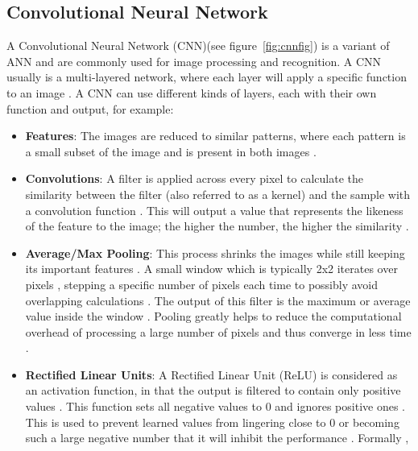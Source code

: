 \subsection{Convolutional Neural Network}\label{sec:headings}
A Convolutional Neural Network (CNN)(see figure~\ref{fig:cnnfig}) is a variant of ANN and are commonly used for image processing and recognition. A CNN usually is a multi-layered network, where each layer will apply a specific function to an image \cite{NIPS2012_4824, karpathy_2018}. A CNN can use different kinds of layers, each with their own function and output, for example:
\begin{itemize}
	\item\textbf{Features}: The images are reduced to similar patterns, where each pattern is a small subset of the image and is present in both images \cite{rohrer_2016}.
	\item\textbf{Convolutions}: A filter is applied across every pixel to calculate the similarity between the filter (also referred to as a kernel) and the sample with a convolution function \cite{rohrer_2016}. This will output a value that represents the likeness of the feature to the image; the higher the number, the higher the similarity \cite{rohrer_2016}.
	\item\textbf{Average/Max Pooling}: This process shrinks the images while still keeping its important features \cite{rohrer_2016}. A small window which is typically 2x2 iterates over pixels \cite{karpathy_2018}, stepping a specific number of pixels each time to possibly avoid overlapping calculations \cite{Ciresan:2011:FHP:2283516.2283603}. The output of this filter is the maximum or average value inside the window \cite{rohrer_2016}. Pooling greatly helps to reduce the computational overhead of processing a large number of pixels and thus converge in less time \cite{Ciresan:2011:FHP:2283516.2283603}.
	\item\textbf{Rectified Linear Units}: A Rectified Linear Unit (ReLU) is considered as an activation function, in that the output is filtered to contain only positive values \cite{sharmav_2017}. This function sets all negative values to 0 and ignores positive ones \cite{sharmav_2017, rohrer_2016}. This is used to prevent learned values from lingering close to 0 or becoming such a large negative number that it will inhibit the performance \cite{rohrer_2016}. Formally \cite{karpathy_2018},
	\begin{equation}

\end{equation}
\end{itemize}
